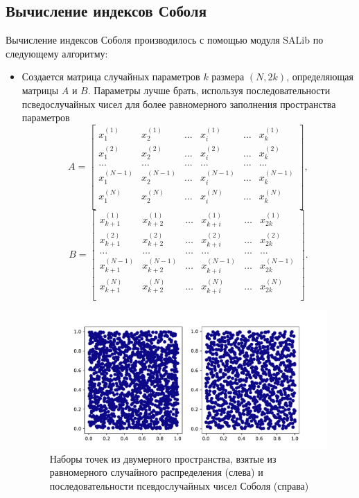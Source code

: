 \documentclass[a4paper,12pt]{article} %
\begin{document}
\subsection{Вычисление индексов Соболя}
Вычисление индексов Соболя производилось с помощью модуля SALib \cite{Iwanaga2022, Herman2017} по следующему алгоритму:
\begin{itemize}
\item Создается матрица случайных параметров $k$ размера $(N,2k)$, определяющая матрицы $A$ и $B$. Параметры лучше брать, используя последовательности псведослучайных чисел для более равномерного заполнения пространства параметров \cite{sobol1967distribution, sobol1976uniformly}
\begin{displaymath}
A=\begin{bmatrix}
x_1^{(1)} & x_2^{(1)} & \ldots & x_i^{(1)} & \ldots & x_k^{(1)} \\
x_1^{(2)} & x_2^{(2)} & \ldots & x_i^{(2)} & \ldots & x_k^{(2)} \\
\ldots & \ldots & \ldots & \ldots & \ldots & \ldots \\
x_1^{(N-1)} & x_2^{(N-1)} & \ldots & x_i^{(N-1)} & \ldots & x_k^{(N-1)} \\
x_1^{(N)} & x_2^{(N)} & \ldots & x_i^{(N)} & \ldots & x_k^{(N)} \\
\end{bmatrix},
\end{displaymath}
\begin{displaymath}
B=\begin{bmatrix}
x_{k+1}^{(1)} & x_{k+2}^{(1)} & \ldots & x_{k+i}^{(1)} & \ldots & x_{2k}^{(1)} \\
x_{k+1}^{(2)} & x_{k+2}^{(2)} & \ldots & x_{k+i}^{(2)} & \ldots & x_{2k}^{(2)} \\
\ldots & \ldots & \ldots & \ldots & \ldots & \ldots \\
x_{k+1}^{(N-1)} & x_{k+2}^{(N-1)} & \ldots & x_{k+i}^{(N-1)} & \ldots & x_{2k}^{(N-1)} \\
x_{k+1}^{(N)} & x_{k+2}^{(N)} & \ldots & x_{k+i}^{(N)} & \ldots & x_{2k}^{(N)} \\
\end{bmatrix}.
\end{displaymath}

\begin{figure}[H]
    \centering
    \includegraphics[width=\linewidth]{images/sampling.pdf}
    \caption{Наборы точек из двумерного пространства, взятые из равномерного случайного распределения (слева) и последовательности псевдослучайных чисел Соболя (справа)}
\end{figure}


\end{itemize}
\end{document}

